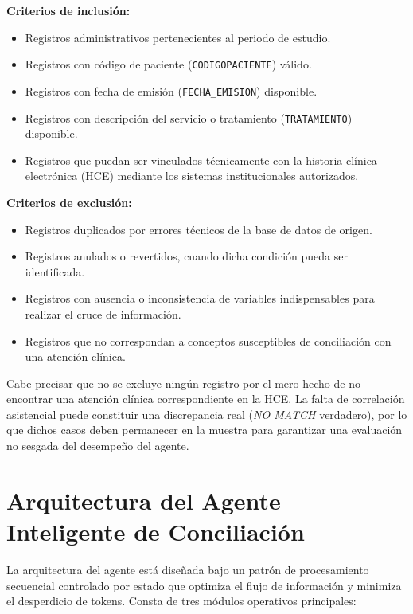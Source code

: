 \textbf{Criterios de inclusión:}
\begin{itemize}
    \item Registros administrativos pertenecientes al periodo de estudio.
    \item Registros con código de paciente (\texttt{CODIGOPACIENTE}) válido.
    \item Registros con fecha de emisión (\texttt{FECHA\_EMISION}) disponible.
    \item Registros con descripción del servicio o tratamiento (\texttt{TRATAMIENTO}) disponible.
    \item Registros que puedan ser vinculados técnicamente con la historia clínica electrónica (HCE) mediante los sistemas institucionales autorizados.
\end{itemize}

\textbf{Criterios de exclusión:}
\begin{itemize}
    \item Registros duplicados por errores técnicos de la base de datos de origen.
    \item Registros anulados o revertidos, cuando dicha condición pueda ser identificada.
    \item Registros con ausencia o inconsistencia de variables indispensables para realizar el cruce de información.
    \item Registros que no correspondan a conceptos susceptibles de conciliación con una atención clínica.
\end{itemize}

Cabe precisar que no se excluye ningún registro por el mero hecho de no encontrar una atención clínica correspondiente en la HCE. La falta de correlación asistencial puede constituir una discrepancia real (\textit{NO MATCH} verdadero), por lo que dichos casos deben permanecer en la muestra para garantizar una evaluación no sesgada del desempeño del agente.

\section{Arquitectura del Agente Inteligente de Conciliación}

La arquitectura del agente está diseñada bajo un patrón de procesamiento secuencial controlado por estado que optimiza el flujo de información y minimiza el desperdicio de tokens. Consta de tres módulos operativos principales:

